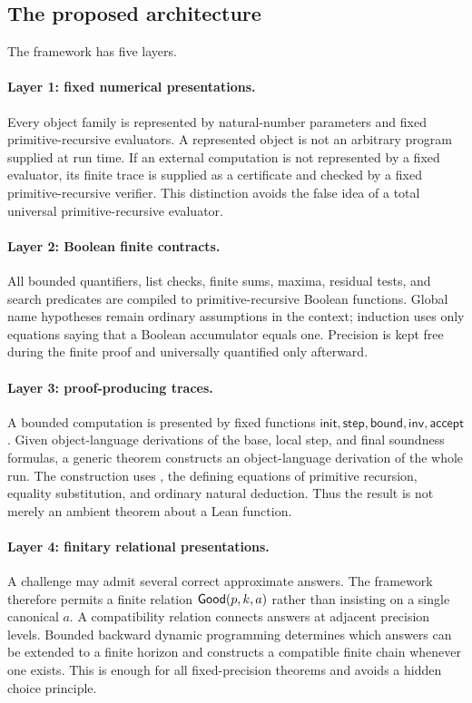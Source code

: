 \subsection{The proposed architecture}

The framework has five layers.

\paragraph{Layer 1: fixed numerical presentations.}
Every object family is represented by natural-number parameters and fixed
primitive-recursive evaluators.  A represented object is not an arbitrary
program supplied at run time.  If an external computation is not represented
by a fixed evaluator, its finite trace is supplied as a certificate and checked
by a fixed primitive-recursive verifier.  This distinction avoids the false
idea of a total universal primitive-recursive evaluator.

\paragraph{Layer 2: Boolean finite contracts.}
All bounded quantifiers, list checks, finite sums, maxima, residual tests, and
search predicates are compiled to primitive-recursive Boolean functions.
Global name hypotheses remain ordinary assumptions in the context; induction
uses only equations saying that a Boolean accumulator equals one.  Precision is
kept free during the finite proof and universally quantified only afterward.

\paragraph{Layer 3: proof-producing traces.}
A bounded computation is presented by fixed functions
\(\mathsf{init},\mathsf{step},\mathsf{bound},\mathsf{inv},\mathsf{accept}\).
Given object-language derivations of the base, local step, and final soundness
formulas, a generic theorem constructs an object-language derivation of the
whole run.  The construction uses , the defining equations of
primitive recursion, equality substitution, and ordinary natural deduction.
Thus the result is not merely an ambient theorem about a Lean function.

\paragraph{Layer 4: finitary relational presentations.}
A challenge may admit several correct approximate answers.  The framework
therefore permits a finite relation \(\mathsf{Good}(p,k,a)\) rather than insisting on a
single canonical \(a\).  A compatibility relation connects answers at adjacent
precision levels.  Bounded backward dynamic programming determines which
answers can be extended to a finite horizon and constructs a compatible finite
chain whenever one exists.  This is enough for all fixed-precision theorems and
avoids a hidden choice principle.

